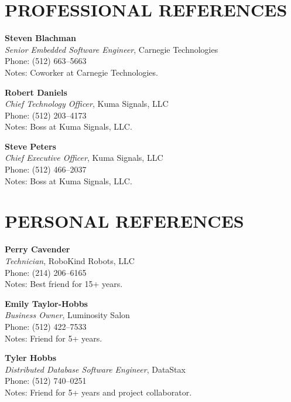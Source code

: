 \documentclass[line,margin=1in]{res}
\begin{document}
\address{1205 Larkwood Drive \\ Austin, Texas 78723}
\address{(512) 237--7562 \\ \url{jonstarr@utexas.edu}}
 
\begin{resume}

\section{PROFESSIONAL REFERENCES}
\vspace*{\baselineskip}

{\bf Steven Blachman } \\
{\sl Senior Embedded Software Engineer}, Carnegie Technologies \\
Phone: (512) 663--5663 \\
Notes: Coworker at Carnegie Technologies.

{\bf Robert Daniels} \\
{\sl Chief Technology Officer}, Kuma Signals, LLC \\
Phone: (512) 203--4173 \\
Notes: Boss at Kuma Signals, LLC.

{\bf Steve Peters} \\
{\sl Chief Executive Officer}, Kuma Signals, LLC \\
Phone: (512) 466--2037 \\
Notes: Boss at Kuma Signals, LLC.

\section{PERSONAL REFERENCES}
\vspace*{\baselineskip}

{\bf Perry Cavender} \\
{\sl Technician}, RoboKind Robots, LLC \\
Phone: (214) 206--6165 \\
Notes: Best friend for 15+ years.

{\bf Emily Taylor-Hobbs} \\
{\sl Business Owner}, Luminosity Salon \\
Phone: (512) 422--7533 \\
Notes: Friend for 5+ years.

{\bf Tyler Hobbs} \\
{\sl Distributed Database Software Engineer}, DataStax \\
Phone: (512) 740--0251 \\
Notes: Friend for 5+ years and project collaborator.

\end{resume}
\end{document}
